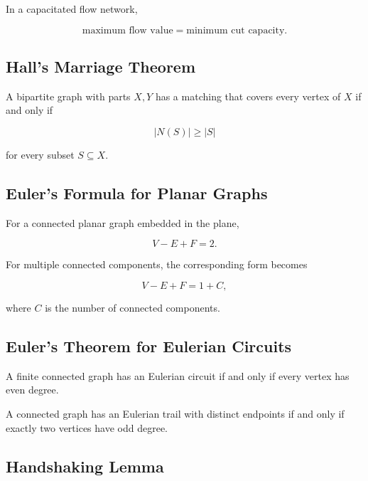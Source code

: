 In a capacitated flow network,

\[
\boxed{
\text{maximum flow value}
=
\text{minimum cut capacity}.
}
\]

\subsection{Hall's Marriage Theorem}
\label{subsec:halls-marriage-summary}

A bipartite graph with parts \(X,Y\) has a matching that covers every vertex
of \(X\) if and only if

\[
\boxed{
|N(S)|
\geq
|S|
}
\]

for every subset \(S\subseteq X\).

\subsection{Euler's Formula for Planar Graphs}
\label{subsec:euler-planar-summary}

For a connected planar graph embedded in the plane,

\[
\boxed{
V-E+F=2.
}
\]

For multiple connected components, the corresponding form becomes

\[
\boxed{
V-E+F
=
1+C,
}
\]

where \(C\) is the number of connected components.

\subsection{Euler's Theorem for Eulerian Circuits}
\label{subsec:eulerian-circuit-theorem-summary}

A finite connected graph has an Eulerian circuit if and only if every vertex
has even degree.

A connected graph has an Eulerian trail with distinct endpoints if and only
if exactly two vertices have odd degree.

\subsection{Handshaking Lemma}
\label{subsec:handshaking-lemma-summary}

